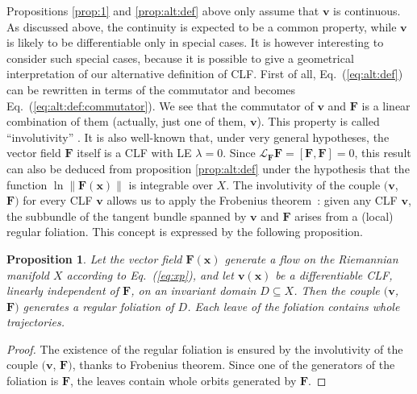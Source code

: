 \documentclass{article}
\theoremstyle{plain}
\newtheorem{proposition}[theorem]{Proposition}
\theoremstyle{definition}
\theoremstyle{remark}
\newcommand{\vect}[1]{\boldsymbol{#1}}
\providecommand{\detail}[1]{#1}
\renewcommand{\detail}[1]{}
\begin{document}
Propositions \ref{prop:1} and \ref{prop:alt:def}
above only assume that $\vect{v}$ is
  continuous. As discussed above, the continuity is expected to be a
  common property, while $\vect{v}$ is likely to be differentiable only in
  special cases. It is however interesting to consider such special
  cases, because it is possible to give a geometrical interpretation
  of our alternative definition of CLF. First of all,
  Eq.~(\ref{eq:alt:def}) can be rewritten in terms of the commutator
and becomes Eq.~(\ref{eq:alt:def:commutator}).
We see that the commutator of $\vect{v}$ and $\vect{F}$ is a
linear combination of them (actually, just one of them,
$\vect{v}$). This property is called ``involutivity'' \cite{abraham}.
It is also well-known that, under very general hypotheses, 
the vector field $\vect{F}$ itself is a CLF with LE $\lambda=0$.
Since \mbox{$\mathcal{L}_{\vect{F}}\vect{F}=[\vect{F},\vect{F}]=0$},
this result can also be deduced from proposition \ref{prop:alt:def}
under the hypothesis that the function 
$\ln \lVert \vect{F}\left(\vect {x}\right) \rVert$ is
integrable over $X$.
\detail{involutive distribution, chapter 4.3, page 298; it is also
  called integrable distribution, definition 2.2.25, page 92;
  Frobenius theorem 2.2.26, page 93} The involutivity of the couple
$(\vect{v}$, $\vect{F})$ for every CLF $\vect{v}$ allows us to apply the
Frobenius theorem~\cite{abraham}\detail{ see integrable
  distribution, definition 2.2.25, page 92; Frobenius theorem 2.2.26,
  page 93}: given any CLF $\vect{v}$, the subbundle of the tangent
bundle spanned by $\vect{v}$ and $\vect{F}$ arises from a (local)
regular foliation. This concept is expressed by the following
proposition. 

\begin{proposition} \label{prop:geo:CLF:foliation}
  Let the vector field $\vect{F}(\vect{x})$ generate a flow on the
  Riemannian manifold $X$ according to Eq.~(\ref{eq:xp}), and let
  $\vect{v}(\vect{x})$ be a differentiable CLF, linearly independent
of $\vect F$, on an invariant domain $D\subseteq X$. 
Then the couple $(\vect{v}$, $\vect{F})$ generates a
  regular foliation of $D$. Each leave of the foliation contains whole
  trajectories.
\end{proposition}

\begin{proof}
  The existence of the regular foliation is ensured by the
  involutivity of the couple $(\vect{v}$, $\vect{F})$, thanks to 
  Frobenius theorem. Since one of the generators 
of the foliation is $\vect{F}$, the
  leaves contain whole orbits generated by $\vect{F}$.
\end{proof}
\end{document}
